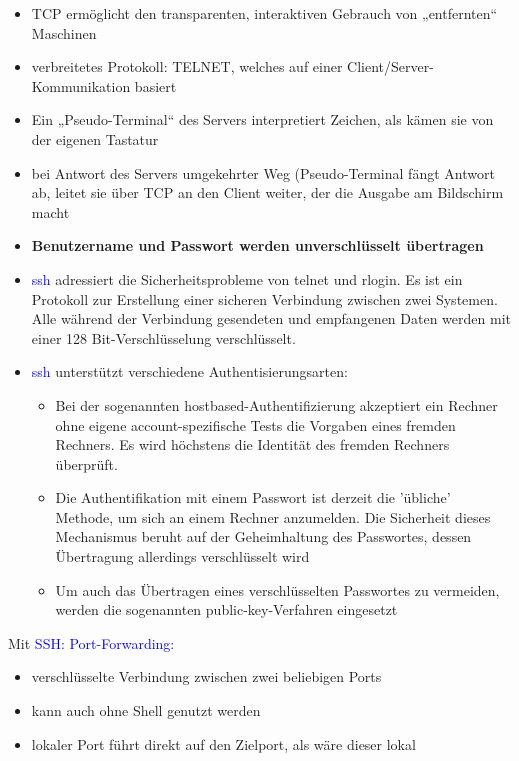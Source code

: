 \begin{itemize}
    \item TCP ermöglicht den transparenten, interaktiven Gebrauch von „entfernten“ Maschinen
    \item verbreitetes Protokoll: TELNET, welches auf einer Client/Server-Kommunikation basiert
    \item Ein „Pseudo-Terminal“ des Servers interpretiert Zeichen, als kämen sie von der eigenen Tastatur
    \item bei Antwort des Servers umgekehrter Weg (Pseudo-Terminal fängt Antwort ab, leitet sie über TCP an den Client weiter, der die Ausgabe am Bildschirm macht
    \item \textbf{Benutzername und Passwort werden unverschlüsselt übertragen}
\end{itemize}

\begin{itemize}
    \item \textcolor{blue}{ssh} adressiert die Sicherheitsprobleme von telnet und rlogin.
    Es ist ein Protokoll zur Erstellung einer sicheren Verbindung zwischen zwei Systemen.
    Alle während der Verbindung gesendeten und empfangenen Daten werden mit einer 128 Bit-Verschlüsselung verschlüsselt.
    \item \textcolor{blue}{ssh} unterstützt verschiedene Authentisierungsarten:
    \begin{itemize}
        \item Bei der sogenannten hostbased-Authentifizierung akzeptiert ein Rechner ohne eigene account-spezifische Tests die Vorgaben eines fremden Rechners.
        Es wird höchstens die Identität des fremden Rechners überprüft.
        \item Die Authentifikation mit einem Passwort ist derzeit die 'übliche' Methode, um sich an einem Rechner anzumelden.
        Die Sicherheit dieses Mechanismus beruht auf der Geheimhaltung des Passwortes, dessen Übertragung allerdings verschlüsselt wird
        \item Um auch das Übertragen eines verschlüsselten Passwortes zu vermeiden, werden die sogenannten public-key-Verfahren eingesetzt
    \end{itemize}
\end{itemize}

Mit \textcolor{blue}{SSH: Port-Forwarding:}
\begin{itemize}
    \item verschlüsselte Verbindung zwischen zwei beliebigen Ports
    \item kann auch ohne Shell genutzt werden
    \item lokaler Port führt direkt auf den Zielport, als wäre dieser lokal
\end{itemize}


